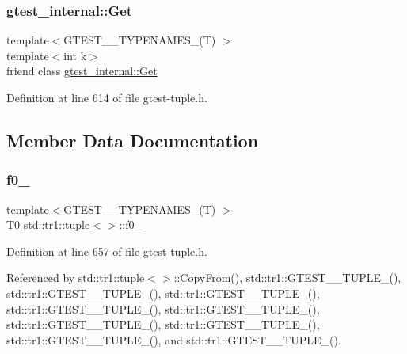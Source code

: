 \subsubsection{\texorpdfstring{gtest\+\_\+internal\+::\+Get}{gtest\_internal::Get}}
{\footnotesize\ttfamily template$<$G\+T\+E\+S\+T\+\_\+\_\+\+T\+Y\+P\+E\+N\+A\+M\+E\+S\+\_\+(\+T) $>$ \\
template$<$int k$>$ \\
friend class \hyperlink{classstd_1_1tr1_1_1gtest__internal_1_1Get}{gtest\+\_\+internal\+::\+Get}\hspace{0.3cm}{\ttfamily [friend]}}



Definition at line 614 of file gtest-\/tuple.\+h.



\subsection{Member Data Documentation}
\mbox{\label{classstd_1_1tr1_1_1tuple_a771b1d99e8800fb284acd04bca838cbb}} 
\subsubsection{\texorpdfstring{f0\+\_\+}{f0\_}}
{\footnotesize\ttfamily template$<$G\+T\+E\+S\+T\+\_\+\_\+\+T\+Y\+P\+E\+N\+A\+M\+E\+S\+\_\+(\+T) $>$ \\
T0 \hyperlink{classstd_1_1tr1_1_1tuple}{std\+::tr1\+::tuple}$<$$>$\+::f0\+\_\+}



Definition at line 657 of file gtest-\/tuple.\+h.



Referenced by std\+::tr1\+::tuple$<$$>$\+::\+Copy\+From(), std\+::tr1\+::\+G\+T\+E\+S\+T\+\_\+\_\+\+T\+U\+P\+L\+E\+\_\+(), std\+::tr1\+::\+G\+T\+E\+S\+T\+\_\+\_\+\+T\+U\+P\+L\+E\+\_\+(), std\+::tr1\+::\+G\+T\+E\+S\+T\+\_\+\_\+\+T\+U\+P\+L\+E\+\_\+(), std\+::tr1\+::\+G\+T\+E\+S\+T\+\_\+\_\+\+T\+U\+P\+L\+E\+\_\+(), std\+::tr1\+::\+G\+T\+E\+S\+T\+\_\+\_\+\+T\+U\+P\+L\+E\+\_\+(), std\+::tr1\+::\+G\+T\+E\+S\+T\+\_\+\_\+\+T\+U\+P\+L\+E\+\_\+(), std\+::tr1\+::\+G\+T\+E\+S\+T\+\_\+\_\+\+T\+U\+P\+L\+E\+\_\+(), std\+::tr1\+::\+G\+T\+E\+S\+T\+\_\+\_\+\+T\+U\+P\+L\+E\+\_\+(), and std\+::tr1\+::\+G\+T\+E\+S\+T\+\_\+\_\+\+T\+U\+P\+L\+E\+\_\+().


